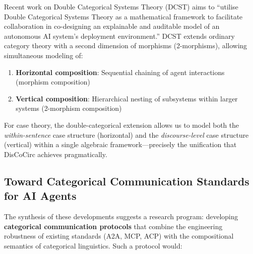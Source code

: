 \documentclass[
]{article}
\providecommand{\tightlist}{%
  \setlength{\itemsep}{0pt}\setlength{\parskip}{0pt}}
\numberwithin{equation}{section}
\begin{document}
Recent work on Double Categorical Systems Theory (DCST) aims to
``utilise Double Categorical Systems Theory as a mathematical framework
to facilitate collaboration in co-designing an explainable and auditable
model of an autonomous AI system's deployment environment.'' DCST
extends ordinary category theory with a second dimension of morphisms
(2-morphisms), allowing simultaneous modeling of:

\begin{enumerate}
\def\labelenumi{\arabic{enumi}.}
\tightlist
\item
  \textbf{Horizontal composition}: Sequential chaining of agent
  interactions (morphism composition)
\item
  \textbf{Vertical composition}: Hierarchical nesting of subsystems
  within larger systems (2-morphism composition)
\end{enumerate}

For case theory, the double-categorical extension allows us to model
both the \emph{within-sentence} case structure (horizontal) and the
\emph{discourse-level} case structure (vertical) within a single
algebraic framework---precisely the unification that DisCoCirc achieves
pragmatically.

\subsection{Toward Categorical Communication Standards for AI
Agents}\label{toward-categorical-communication-standards-for-ai-agents}

The synthesis of these developments suggests a research program:
developing \textbf{categorical communication protocols} that combine the
engineering robustness of existing standards (A2A, MCP, ACP) with the
compositional semantics of categorical linguistics. Such a protocol
would:
\end{document}
